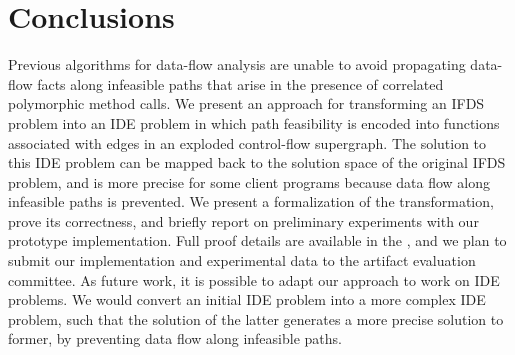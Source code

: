 \section{Conclusions}
  \label{sec:Conclusions}
  
Previous algorithms for data-flow analysis are unable to avoid propagating
data-flow facts along infeasible paths that arise in the presence of
correlated polymorphic method calls. 
% 
We present an approach for transforming an IFDS problem into an IDE problem
in which path feasibility is encoded into functions associated
with edges in an exploded control-flow supergraph. The solution to this
IDE problem can be mapped back to the solution space of the original IFDS
problem, and is more precise for some client programs because data flow along
infeasible paths is prevented. We present a formalization of the
transformation, prove its correctness, and briefly report on
preliminary experiments with our prototype implementation. Full proof
details are available in the \reportOrAppendix,
and we plan to submit our implementation and experimental data to the
artifact evaluation committee. 
%  
As future work, it is possible to adapt our approach to work on IDE
problems. We would convert an initial IDE problem into a more complex IDE problem, 
such that the solution of the latter generates a more precise
solution to former, by preventing data flow along infeasible paths.
